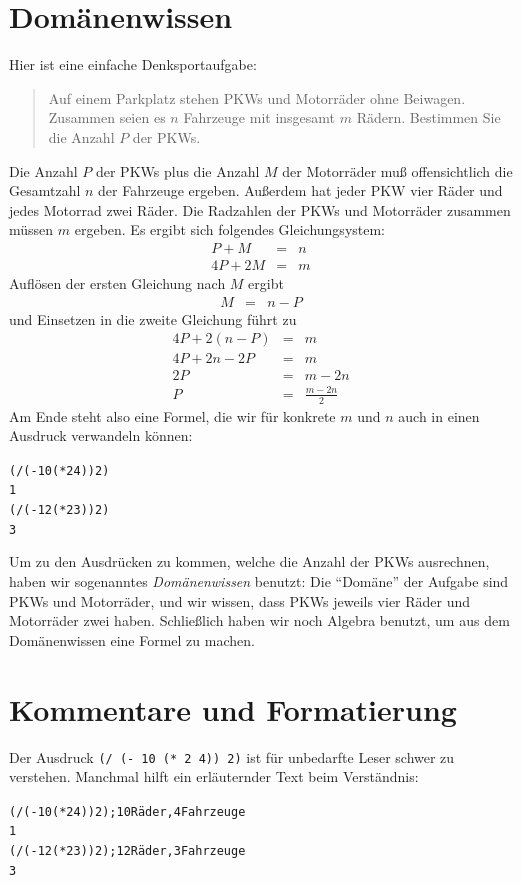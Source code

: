 \section{Domänenwissen}
\label{sec:domaenenwissen}

Hier ist eine einfache Denksportaufgabe:
%
\begin{quote}
  Auf einem Parkplatz stehen PKWs und Motorräder ohne Beiwagen.
  Zusammen seien es $n$ Fahrzeuge mit insgesamt $m$ Rädern.  Bestimmen
  Sie die Anzahl $P$ der PKWs.
\end{quote}
%
Die Anzahl $P$ der PKWs plus die Anzahl $M$ der Motorräder muß
offensichtlich die Gesamtzahl $n$ der Fahrzeuge ergeben.  Außerdem hat
jeder PKW vier Räder und jedes Motorrad zwei Räder. Die Radzahlen der
PKWs und Motorräder zusammen müssen $m$ ergeben.  Es ergibt sich
folgendes Gleichungsystem:
%
\begin{eqnarray*}
  P+M&=&n\\
  4P+2M&=&m
\end{eqnarray*}
%
Auflösen der ersten Gleichung nach $M$ ergibt
\begin{eqnarray*}
  M &=& n-P
\end{eqnarray*}
% 
und Einsetzen in die zweite Gleichung führt zu
\begin{eqnarray*}
  4P+2(n-P) &=& m\\
  4P+2n-2P &=& m\\
  2P &=& m-2n\\
  P &=& \frac{m-2n}{2}
\end{eqnarray*}
%
Am Ende steht also eine Formel, die wir für konkrete $m$ und $n$ auch
in einen Ausdruck verwandeln können:
%
\begin{alltt}
(/ (- 10 (* 2 4)) 2)
\evalsto{} 1
(/ (- 12 (* 2 3)) 2)
\evalsto{} 3
\end{alltt}
%
Um zu den Ausdrücken zu kommen, welche die Anzahl der PKWs ausrechnen,
haben wir sogenanntes \textit{Domänenwissen}
benutzt: Die "`Domäne"' der Aufgabe sind PKWs und Motorräder, und wir
wissen, dass PKWs jeweils vier Räder und Motorräder zwei haben.
Schließlich haben wir noch Algebra benutzt, um aus dem Domänenwissen
eine Formel zu machen.

\section{Kommentare und Formatierung}

Der Ausdruck \texttt{(/ (- 10 (* 2 4)) 2)} ist für unbedarfte Leser
schwer zu verstehen.  Manchmal hilft ein erläuternder Text beim
Verständnis:
%
\begin{alltt}
(/ (- 10 (* 2 4)) 2) ; 10 Räder, 4 Fahrzeuge
\evalsto{} 1
(/ (- 12 (* 2 3)) 2) ; 12 Räder, 3 Fahrzeuge
\evalsto{} 3
\end{alltt}

